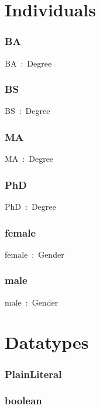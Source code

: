 \documentclass{article}
\begin{document}
\section*{Individuals}\subsubsection*{BA}

BA~:~Degree

\subsubsection*{BS}

BS~:~Degree

\subsubsection*{MA}

MA~:~Degree

\subsubsection*{PhD}

PhD~:~Degree

\subsubsection*{female}

female~:~Gender

\subsubsection*{male}

male~:~Gender

\section*{Datatypes}\subsubsection*{PlainLiteral}

\subsubsection*{boolean}
\end{document}
